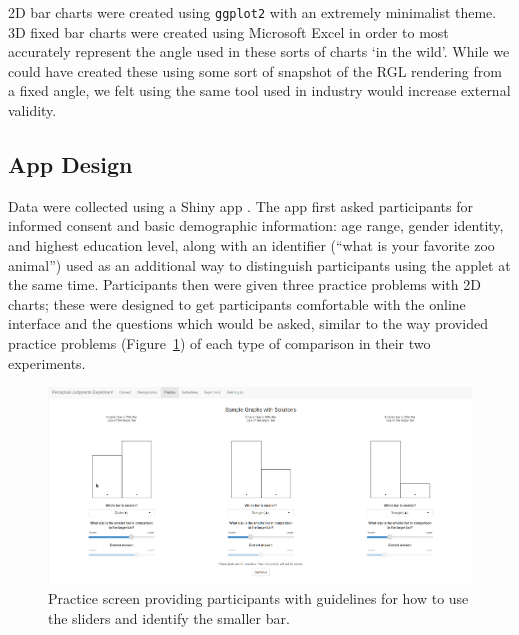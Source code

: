 \documentclass[runningheads
]{llncs}
\begin{document}
2D bar charts were created using \texttt{ggplot2} \autocite{ggplot2}
with an extremely minimalist theme. 3D fixed bar charts were created
using Microsoft Excel in order to most accurately represent the angle
used in these sorts of charts `in the wild'. While we could have created
these using some sort of snapshot of the RGL rendering from a fixed
angle, we felt using the same tool used in industry would increase
external validity.

\hypertarget{app-design}{%
\subsection{App Design}\label{app-design}}

Data were collected using a Shiny app \autocite{shiny}. The app first
asked participants for informed consent and basic demographic
information: age range, gender identity, and highest education level,
along with an identifier (``what is your favorite zoo animal'') used as
an additional way to distinguish participants using the applet at the
same time. Participants then were given three practice problems with 2D
charts; these were designed to get participants comfortable with the
online interface and the questions which would be asked, similar to the
way \textcite{clevelandGraphicalPerceptionTheory1984} provided practice
problems (Figure~\ref{fig-practice-screen}) of each type of comparison
in their two experiments.

\begin{figure}

{\centering \includegraphics{image/03-Practice-2.png}

}

\caption{\label{fig-practice-screen}Practice screen providing
participants with guidelines for how to use the sliders and identify the
smaller bar.}

\end{figure}
\end{document}
